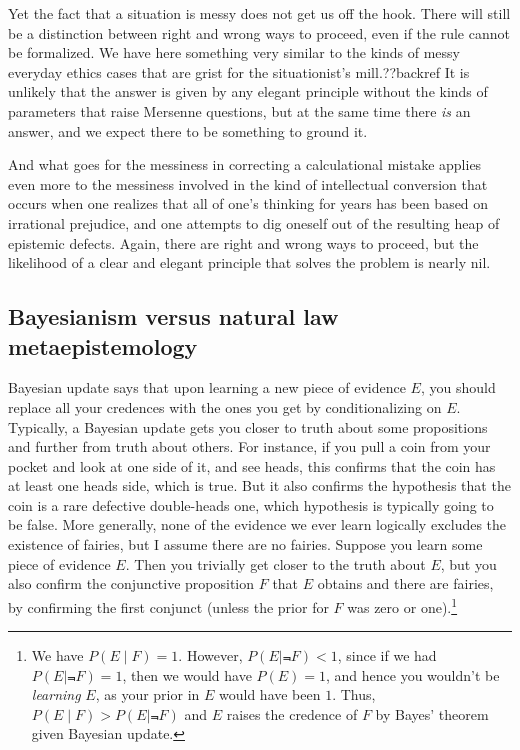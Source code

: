Yet the fact that a situation is messy does not get us off the hook. There will still
be a distinction between right and wrong ways to proceed, even if the rule cannot be formalized. We have here something very
similar to the kinds of messy everyday ethics cases that are grist for the situationist's mill.??backref 
It is unlikely that the answer is given by any elegant principle without the kinds of parameters that raise Mersenne
questions, but at the same time there \textit{is} an answer, and we expect there to be something to ground it.

And what goes for the messiness in correcting a calculational mistake applies even more to the messiness involved in
the kind of intellectual conversion that occurs when one realizes that all of one's thinking for years has been based
on irrational prejudice, and one attempts to dig oneself out of the resulting heap of epistemic defects. Again, there
are right and wrong ways to proceed, but the likelihood of a clear and elegant principle that solves the problem is
nearly nil. 

\subsection{Bayesianism versus natural law metaepistemology}
Bayesian update says that upon learning a new piece of evidence $E$, you should replace all your credences with the 
ones you get by conditionalizing on $E$. Typically, a Bayesian update gets you closer to truth about some 
propositions and further from truth about others. For instance, if you pull a coin from your pocket and look at one
side of it, and see heads, this confirms that the coin has at least one heads side, which is true. But it also 
confirms the hypothesis that the coin is a rare defective double-heads one, which hypothesis is typically going to 
be false. More generally, none of the evidence we ever learn logically excludes the existence of fairies, but I 
assume there are no fairies. Suppose you learn some piece of evidence $E$. Then you trivially get closer to the truth
about $E$, but you also confirm the conjunctive proposition $F$ that $E$ obtains and there are fairies, by confirming the 
first conjunct (unless the prior for $F$ was zero or one).\footnote{We have $P(E\mid F)=1$. However, $P(E\mid \Not F)<1$,
since if we had $P(E\mid \Not F)=1$, then we would have $P(E)=1$, and hence you wouldn't be \textit{learning} $E$, as your
prior in $E$ would have been $1$. Thus, $P(E\mid F)>P(E\mid\Not F)$ and $E$ raises the credence of $F$ by Bayes' theorem
given Bayesian update.} 


